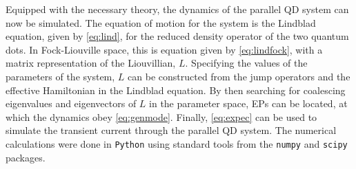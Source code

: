 \documentclass[../main.tex]{subfiles}
\begin{document}
Equipped with the necessary theory, the dynamics of the parallel QD system can now be simulated. The equation of motion for the system is the Lindblad equation, given by \cref{eq:lind}, for the reduced density operator of the two quantum dots. In Fock-Liouville space, this is equation given by \cref{eq:lindfock}, with a matrix representation of the Liouvillian, $L$. Specifying the values of the parameters of the system, $L$ can be constructed from the jump operators and the effective Hamiltonian in the Lindblad equation. By then searching for coalescing eigenvalues and eigenvectors of $L$ in the parameter space, EPs can be located, at which the dynamics obey \cref{eq:genmode}. Finally, \cref{eq:expec} can be used to simulate the transient current through the parallel QD system. The numerical calculations were done in \verb+Python+ using standard tools from the \verb+numpy+ and \verb+scipy+ packages. 
\end{document}
